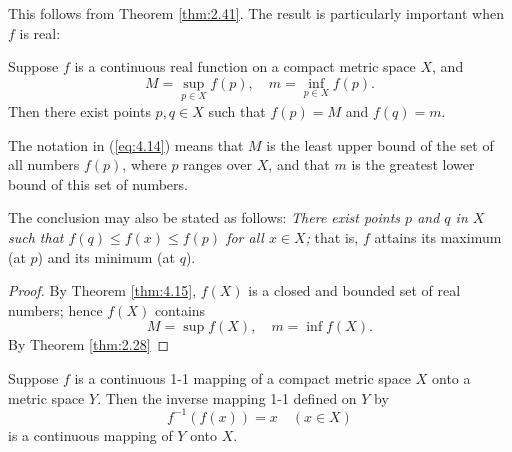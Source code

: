 This follows from Theorem \ref{thm:2.41}.
The result is particularly important when $f$ is real:

\begin{thm}
    \label{thm:4.16}
    Suppose $f$ is a continuous real function on a compact metric space $X$, and
    \begin{equation}
        \label{eq:4.14}
        M = \sup_{p\in X} f(p), \quad
        m = \inf_{p\in X} f(p).
    \end{equation}
    Then there exist points $p, q \in X$
    such that $f(p) = M$ and $f(q) = m$.
\end{thm}

The notation in (\ref{eq:4.14}) means that
$M$ is the least upper bound of the set of all numbers $f(p)$,
where $p$ ranges over $X$,
and that $m$ is the greatest lower bound of this set of numbers.

The conclusion may also be stated as follows:
\emph{There exist points $p$ and $q$
    in $X$ such that $f(q) \leq f(x) \leq f(p)$ for all $x \in X$;}
that is, $f$ attains its maximum (at $p$) and its minimum (at $q$).

\begin{proof}
    By Theorem \ref{thm:4.15},
    $f(X)$ is a closed and bounded set of real numbers;
    hence $f(X)$ contains
    \begin{equation*}
        M = \sup f(X), \quad
        m = \inf f(X).
    \end{equation*}
    By Theorem \ref{thm:2.28}
\end{proof}

\begin{thm}
    \label{thm:4.17}
    Suppose $f$ is a continuous 1-1 mapping of a compact metric space $X$ onto a metric space $Y$.
    Then the inverse mapping 1-1 defined on $Y$ by
    \begin{equation*}
        f^{-1}(f(x)) = x \quad
        (x \in X)
    \end{equation*}
    is a continuous mapping of $Y$ onto $X$.
\end{thm}

